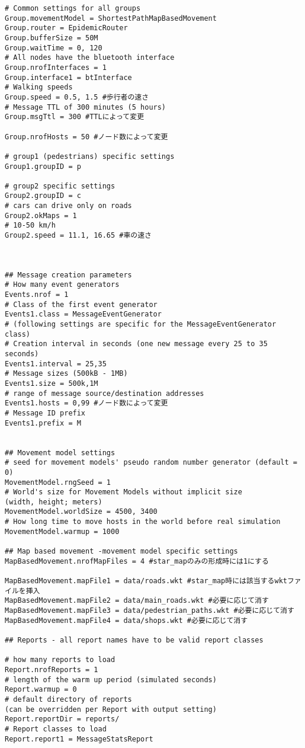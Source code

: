 \documentclass[11pt]{icsthesis}
\begin{document}
\begin{framed}
\begin{verbatim}
# Common settings for all groups
Group.movementModel = ShortestPathMapBasedMovement
Group.router = EpidemicRouter
Group.bufferSize = 50M
Group.waitTime = 0, 120
# All nodes have the bluetooth interface
Group.nrofInterfaces = 1
Group.interface1 = btInterface
# Walking speeds
Group.speed = 0.5, 1.5 #歩行者の速さ
# Message TTL of 300 minutes (5 hours)
Group.msgTtl = 300 #TTLによって変更

Group.nrofHosts = 50 #ノード数によって変更

# group1 (pedestrians) specific settings
Group1.groupID = p

# group2 specific settings
Group2.groupID = c
# cars can drive only on roads
Group2.okMaps = 1
# 10-50 km/h
Group2.speed = 11.1, 16.65 #車の速さ



## Message creation parameters 
# How many event generators
Events.nrof = 1
# Class of the first event generator
Events1.class = MessageEventGenerator
# (following settings are specific for the MessageEventGenerator class)
# Creation interval in seconds (one new message every 25 to 35 seconds)
Events1.interval = 25,35
# Message sizes (500kB - 1MB)
Events1.size = 500k,1M
# range of message source/destination addresses
Events1.hosts = 0,99 #ノード数によって変更
# Message ID prefix
Events1.prefix = M


## Movement model settings
# seed for movement models' pseudo random number generator (default = 0)
MovementModel.rngSeed = 1
# World's size for Movement Models without implicit size 
(width, height; meters)
MovementModel.worldSize = 4500, 3400
# How long time to move hosts in the world before real simulation
MovementModel.warmup = 1000

## Map based movement -movement model specific settings
MapBasedMovement.nrofMapFiles = 4 #star_mapのみの形成時には1にする

MapBasedMovement.mapFile1 = data/roads.wkt #star_map時には該当するwktファイルを挿入
MapBasedMovement.mapFile2 = data/main_roads.wkt #必要に応じて消す
MapBasedMovement.mapFile3 = data/pedestrian_paths.wkt #必要に応じて消す
MapBasedMovement.mapFile4 = data/shops.wkt #必要に応じて消す

## Reports - all report names have to be valid report classes

# how many reports to load
Report.nrofReports = 1
# length of the warm up period (simulated seconds)
Report.warmup = 0
# default directory of reports 
(can be overridden per Report with output setting)
Report.reportDir = reports/
# Report classes to load
Report.report1 = MessageStatsReport


\end{verbatim}
\end{framed}
\end{document}
